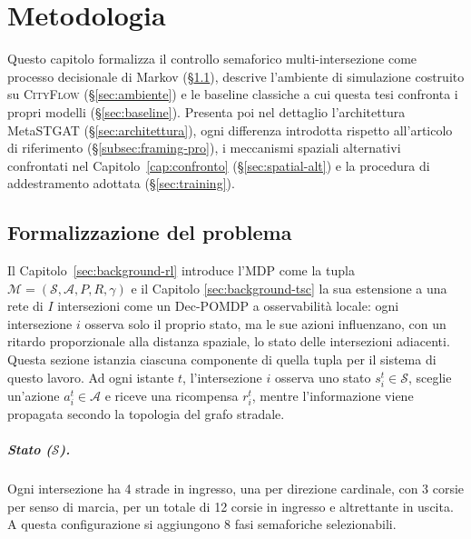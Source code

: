 \chapter{Metodologia}
\label{cap:tsc-modelli}

Questo capitolo formalizza il controllo semaforico multi-intersezione
come processo decisionale di Markov (§\ref{sec:formalizzazione}),
descrive l'ambiente di simulazione costruito su \textsc{CityFlow}
(§\ref{sec:ambiente}) e le baseline classiche a cui questa tesi confronta
i propri modelli (§\ref{sec:baseline}). Presenta poi nel dettaglio
l'architettura MetaSTGAT (§\ref{sec:architettura}), ogni differenza
introdotta rispetto all'articolo di riferimento
(§\ref{subsec:framing-pro}), i meccanismi spaziali alternativi
confrontati nel Capitolo~\ref{cap:confronto} (§\ref{sec:spatial-alt}) e la
procedura di addestramento adottata (§\ref{sec:training}).

\section{Formalizzazione del problema}
\label{sec:formalizzazione}

Il Capitolo~\ref{sec:background-rl} introduce l'MDP
come la tupla $\mathcal{M} = (\mathcal{S}, \mathcal{A}, P, R, \gamma)$ e
il Capitolo \ref{sec:background-tsc} la sua estensione a una rete di $I$ intersezioni
come un Dec-POMDP a osservabilità locale: ogni intersezione $i$ osserva solo
il proprio stato, ma le sue azioni influenzano, con un ritardo proporzionale
alla distanza spaziale, lo stato delle intersezioni adiacenti. Questa sezione
istanzia ciascuna componente di quella tupla per il sistema di questo lavoro.
Ad ogni istante $t$, l'intersezione $i$ osserva uno stato $s_i^t \in \mathcal{S}$, sceglie
un'azione $a_i^t \in \mathcal{A}$ e riceve una ricompensa $r_i^t$,
mentre l'informazione viene propagata secondo la topologia del grafo stradale.

\paragraph{Stato ($\mathcal{S}$).} Ogni intersezione ha 4 strade in ingresso,
una per direzione cardinale, con 3 corsie per senso di marcia, per un totale
di 12 corsie in ingresso e altrettante in uscita. A
questa configurazione si aggiungono 8 fasi semaforiche selezionabili.

